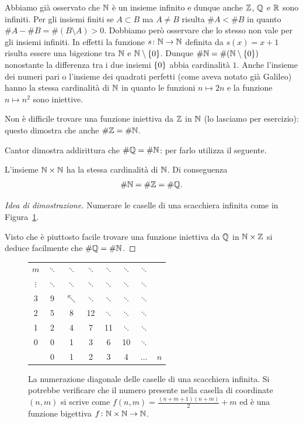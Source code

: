 Abbiamo già osservato che ${\mathbb N}$ è un insieme infinito e dunque 
anche ${\mathbb Z}$, ${\mathbb Q}$ e ${\mathbb R}$ sono infiniti.
Per gli insiemi finiti se $A\subset B$ ma $A\neq B$ risulta $\#A < \# B$
in quanto $\#A - \#B = \#(B\setminus A) > 0$. 
Dobbiamo però osservare che lo stesso non vale per gli insiemi infiniti.
In effetti la funzione $s\colon {\mathbb N} \to {\mathbb N}$ definita da $s(x)=x+1$
risulta essere una bigezione tra ${\mathbb N}$ e ${\mathbb N}\setminus{\left\{ 0 \right\}}$. 
Dunque $\#{\mathbb N} = \#({\mathbb N}\setminus{\left\{ 0 \right\}})$ 
nonostante la differenza tra i due insiemi ${\left\{ 0 \right\}}$ abbia 
cardinalità $1$. 
Anche l'insieme dei numeri pari o l'insieme 
dei quadrati perfetti (come aveva notato già Galileo)
hanno la stessa cardinalità di ${\mathbb N}$ in quanto le funzioni $n\mapsto 2n$
e la funzione $n\mapsto n^2$ sono iniettive.

Non è difficile trovare una funzione iniettiva da ${\mathbb Z}$ in ${\mathbb N}$
(lo lasciamo per esercizio): questo dimostra che anche $\#{\mathbb Z} = \# {\mathbb N}$.

Cantor dimostra addirittura che $\#{\mathbb Q} = \#{\mathbb N}$: 
per farlo utilizza il seguente.

\begin{theorem}
\label{th:Cantor_primo}%
%
L'insieme ${\mathbb N} \times {\mathbb N}$ ha la stessa cardinalità di ${\mathbb N}$. Di conseguenza
\[
  \# {\mathbb N} = \# {\mathbb Z} = \# {\mathbb Q}.
  \]
\end{theorem}
%
\begin{proof}[Idea di dimostrazione]
  Numerare le caselle di una scacchiera infinita
  come in Figura~\ref{fig:cantor1}.
  
  Visto che è piuttosto facile trovare una funzione iniettiva 
  da ${\mathbb Q}$ in ${\mathbb N} \times {\mathbb Z}$ si deduce facilmente che $\#{\mathbb Q} = \#{\mathbb N}$.
\end{proof}

\begin{figure}
  \begin{tabular}{c|ccccccc}
   $m$ & $\ddots$ & $\ddots$ & $\ddots$ & $\ddots$ & $\ddots$ & $\ddots$\\
   $\vdots$ & $\ddots$ & $\ddots$ & $\ddots$ & $\ddots$ & $\ddots$ & $\ddots$\\
   3 & 9 & $\nwarrow$ & $\ddots$  & $\ddots$ & $\ddots$ & $\ddots$\\
   2 & 5 & 8 & 12 & $\ddots$  & $\ddots$ & $\ddots$\\
   1 & 2 & 4 & 7 & 11 & $\ddots$  & $\ddots$\\
   0 & 0 & 1 & 3 & 6 & 10 & $\ddots$ \\ \hline
     & 0 & 1 & 2 & 3 & 4 & $\dots$ & $n$
  \end{tabular}
  \caption{
    La numerazione diagonale delle caselle
    di una scacchiera infinita. Si potrebbe verificare
    che il numero presente nella casella di coordinate $(n,m)$
    si scrive come $f(n,m) = \frac{(n+m+1)(n+m)}{2}+m$
    ed è una funzione bigettiva $f\colon {\mathbb N}\times{\mathbb N} \to{\mathbb N}$.}
  \label{fig:cantor1}
\end{figure}


